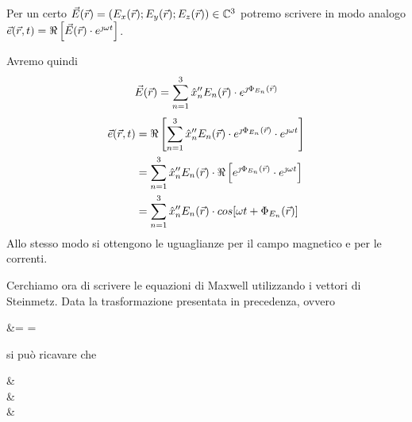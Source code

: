 Per un certo $\vec{E}(\vec{r}) = \left(E_x(\vec{r});E_y(\vec{r});E_z(\vec{r})\right) \in \mathbb{C}^3$ potremo scrivere in modo analogo $\vec{e}(\vec{r},t) = \Re\left[\vec{E}(\vec{r})\cdot e^{\jmath \omega t}\right]$.

Avremo quindi
\begin{equation*}
	\vec{E}(\vec{r}) = \sum\limits_{n=1}^3 \hat{x}_n^{\prime\prime} E_n(\vec{r})\cdot e^{\jmath \Phi_{E_n}(\vec{r})}
\end{equation*}
\begin{equation*}\begin{split}
	\vec{e}(\vec{r},t) &= \Re\left[\sum\limits_{n=1}^3 \hat{x}_n^{\prime\prime} E_n(\vec{r})\cdot e^{\jmath \Phi_{E_n}(\vec{r})}\cdot e^{\jmath \omega t}\right]\\
	&=\sum\limits_{n=1}^3 \hat{x}_n^{\prime\prime} E_n(\vec{r})\cdot \Re\left[e^{\jmath \Phi_{E_n}(\vec{r})}\cdot e^{\jmath \omega t}\right]\\
	&=\sum\limits_{n=1}^3 \hat{x}_n^{\prime\prime} E_n(\vec{r})\cdot cos[\omega t + \Phi_{E_n}(\vec{r})]
\end{split}\end{equation*}
Allo stesso modo si ottengono le uguaglianze per il campo magnetico e per le correnti.

Cerchiamo ora di scrivere le equazioni di Maxwell utilizzando i vettori di Steinmetz. Data la trasformazione presentata in precedenza, ovvero
\begin{esp}
	\rot \e &= \rot \Re{} = \Re{}\\
\end{esp}

si può ricavare che
\begin{esp}
	\rot\e &\leftrightarrow \rot\E \\
	\diverg\e &\leftrightarrow \diverg\E \\
	 & \leftrightarrow \jmath \omega \E\quad {} \\
\end{esp}

